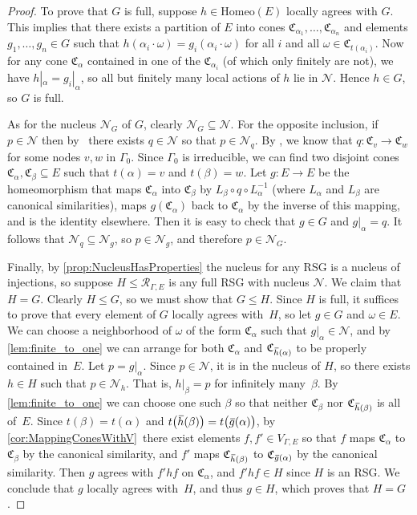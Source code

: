 \documentclass[11pt,letterpaper]{amsart}
\theoremstyle{definition}
\newcommand{\R}{\mathcal{R}}
\newcommand{\Nuc}{\mathcal{N}}
\newcommand{\C}{\mathfrak{C}}
\newcommand{\Homeo}{\mathrm{Homeo}}
\newcommand{\og}{\mkern 2mu\overline{\mkern-2mu g\mkern0.5mu}\mkern-0.5mu}
\newcommand{\oh}{\mkern 2mu\overline{\mkern-2mu h\mkern-0.25mu}\mkern 0.25mu}
\begin{document}
\begin{proof}
To prove that $G$ is full, suppose $h\in\Homeo(E)$ locally agrees with $G$. This implies that there exists a partition of $E$ into cones $\C_{\alpha_1},\ldots,\C_{\alpha_n}$ and elements $g_1,\dots,g_n\in G$ such that $h(\alpha_i\cdot\omega)=g_i(\alpha_i\cdot\omega)$ for all $i$ and all $\omega\in \C_{t(\alpha_i)}$. Now for any cone $\C_\alpha$ contained in one of the $\C_{\alpha_i}$ (of which only finitely are not), we have $h|_\alpha = g_i |_\alpha$, so all but finitely many local actions of $h$ lie in $\Nuc$. Hence $h\in G$, so $G$ is full.

As for the nucleus $\Nuc_G$ of $G$, clearly $\Nuc_G\subseteq\Nuc$. For the opposite inclusion, if $p\in \Nuc$ then by \RecurNuc\ there exists $q\in\Nuc$ so that $p\in\Nuc_q$.  By \MapNuc, we know that $q\colon \C_v\to \C_w$ for some nodes $v,w$ in $\Gamma_0$.  Since $\Gamma_0$ is irreducible, we can find two disjoint cones $\C_\alpha,\C_\beta\subseteq E$ such that $t(\alpha) = v$ and $t(\beta)=w$.  Let $g\colon E\to E$ be the homeomorphism that maps $\C_\alpha$ into $\C_\beta$ by $L_\beta\circ q\circ L_{\alpha}^{-1}$ (where $L_\alpha$ and $L_\beta$ are canonical similarities), maps $g(\C_\alpha)$ back to $\C_\alpha$ by the inverse of this mapping, and is the identity elsewhere.  Then it is easy to check that $g\in G$ and $g|_\alpha=q$.  It follows that $\Nuc_q\subseteq \Nuc_g$, so $p\in \Nuc_g$, and therefore $p\in \Nuc_G$.

Finally, by \cref{prop:NucleusHasProperties} the nucleus for any RSG is a nucleus of injections, so suppose $H\leq \R_{\Gamma,E}$ is any full RSG with nucleus $\Nuc$.  We claim that $H=G$.  Clearly $H\leq G$, so we must show that $G\leq H$.  Since $H$ is full, it suffices to prove that every element of $G$ locally agrees with~$H$, so let $g\in G$ and $\omega \in E$.  We can choose a neighborhood of $\omega$  of the form $\C_\alpha$ such that $g|_\alpha\in\Nuc$, and by \cref{lem:finite_to_one} we can arrange for both $\C_{\alpha}$ and $\C_{\oh(\alpha)}$ to be properly contained in~$E$.  Let $p=g|_\alpha$.  Since $p\in\Nuc$, it is in the nucleus of $H$, so there exists $h\in H$ such that $p\in \Nuc_h$. That is, $h|_{\beta}=p$ for infinitely many~$\beta$. By \cref{lem:finite_to_one} we can choose one such $\beta$ so that neither $\C_\beta$ nor $\C_{\oh(\beta)}$ is all of~$E$. Since $t(\beta)=t(\alpha)$ and $t\bigl(\oh(\beta)\bigr)=t\bigl(\og(\alpha)\bigr)$, by \cref{cor:MappingConesWithV}~there exist elements $f,f'\in V_{\Gamma,E}$ so that $f$ maps $\C_\alpha$ to $\C_\beta$ by the canonical similarity, and $f'$ maps $\C_{\oh(\beta)}$ to $\C_{\og(\alpha)}$ by the canonical similarity.  Then $g$ agrees with $f'hf$ on $\C_\alpha$, and $f'hf\in H$ since $H$ is an RSG.  We conclude that $g$ locally agrees with~$H$, and thus $g\in H$, which proves that $H=G$.
\end{proof}
\end{document}

